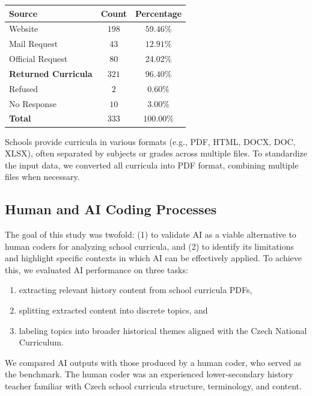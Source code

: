 \documentclass[]{interact}
\theoremstyle{plain}%
\theoremstyle{definition}
\theoremstyle{remark}
\begin{document}
\begin{table}
{\begin{tabular}{lcc} \toprule
Source & Count & Percentage \\ \midrule
Website & $198$ & $59.46\%$ \\
Mail Request & $43$ & $12.91\%$ \\
Official Request & $80$ & 24.02\% \\ \midrule
\textbf{Returned Curricula} & $321$ & $96.40\%$ \\ \midrule
Refused & $2$ & $0.60\%$ \\ 
No Response & $10$ & $3.00\%$ \\ \midrule
\textbf{Total} & $333$ & $100.00\%$ \\ \midrule
\end{tabular}}
\label{curricula-sources}
\end{table}

Schools provide curricula in various formats (e.g., PDF, HTML, DOCX, DOC, XLSX), often separated by subjects or grades across multiple files. To standardize the input data, we converted all curricula into PDF format, combining multiple files when necessary.


\subsection{Human and AI Coding Processes}

The goal of this study was twofold: (1) to validate AI as a viable alternative to human coders for analyzing school curricula, and (2) to identify its limitations and highlight specific contexts in which AI can be effectively applied. To achieve this, we evaluated AI performance on three tasks:  
\begin{enumerate}
    \item extracting relevant history content from school curricula PDFs,  
    \item splitting extracted content into discrete topics, and  
    \item labeling topics into broader historical themes aligned with the Czech National Curriculum.  
\end{enumerate}

We compared AI outputs with those produced by a human coder, who served as the benchmark. The human coder was an experienced lower-secondary history teacher familiar with Czech school curricula structure, terminology, and content.
\end{document}
